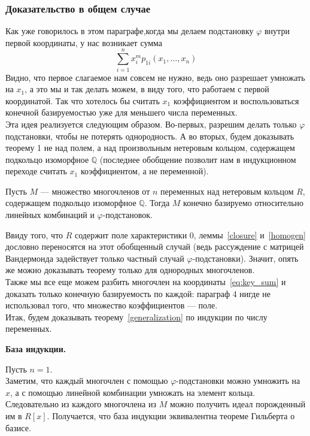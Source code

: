 \subsubsection{Доказательство в общем случае}
Как уже говорилось в этом параграфе,когда мы делаем подстановку $\varphi$ внутри первой координаты, у нас возникает сумма
\[\sum\limits_{i=1}^n x_i^m p_{1i}(x_1,\ldots,x_n)\]
Видно, что первое слагаемое нам совсем не нужно, ведь оно разрешает умножать на $x_1$, а это мы и так делать можем, в виду того, что работаем с первой координатой.
Так что хотелось бы считать $x_1$ коэффициентом и воспользоваться конечной базируемостью уже для меньшего числа переменных.\\
Эта идея реализуется следующим образом.
Во-первых, разрешим делать только $\varphi$ подстановки, чтобы не потерять однородность.
А во вторых, будем доказывать теорему 1 не над полем, а над произвольным нетеровым кольцом, содержащем подкольцо изоморфное $\mathbb{Q}$ (последнее обобщение позволит нам в индукционном переходе считать $x_1$ коэффициентом, а не переменной).\vskip 0.1in\noindent
\begin{theorem}
    \label{generalization}
    Пусть $M$ --- множество многочленов от $n$ переменных над нетеровым кольцом $R$, содержащем подкольцо изоморфное $\mathbb{Q}$.
    Тогда $M$ конечно базируемо относительно линейных комбинаций и $\varphi$-подстановок.
\end{theorem}\vskip 0.1in\noindent
Ввиду того, что $R$ содержит поле характеристики $0$, леммы~\ref{closure} и~\ref{homogen} дословно переносятся на этот обобщенный случай (ведь рассуждение с матрицей Вандермонда задействует только частный случай $\varphi$-подстановки).
Значит, опять же можно доказывать теорему только для однородных многочленов.\\
Также мы все еще можем разбить многочлен на координаты~\ref{eq:key_sum} и доказать только конечную базируемость по каждой: параграф 4 нигде не использовал того, что множество коэффициентов --- поле.\\
Итак, будем доказывать теорему~\ref{generalization} по индукции по числу переменных.

\vskip 0.1in\noindent
{\large\textbf{База индукции.}}

Пусть $n=1$.\\
Заметим, что каждый многочлен с помощью $\varphi$-подстановки можно умножить на $x$, а с помощью линейной комбинации умножать на элемент кольца.\\
Следовательно из каждого многочлена из $M$ можно получить идеал порожденный им в $R[x]$.
Получается, что база индукции эквивалентна теореме Гильберта о базисе.

